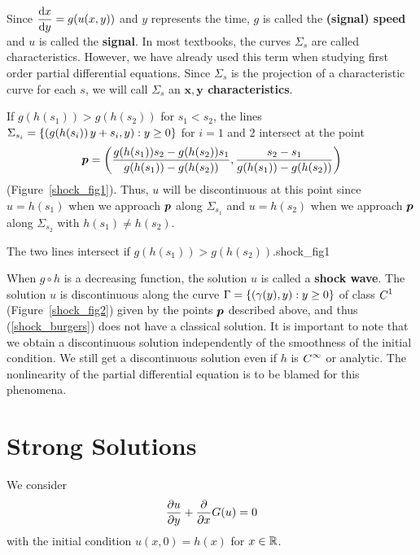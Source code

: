 Since $\DS \dydx{x}{y} = g(u(x,y))$ and $y$ represents the time,
$g$ is called the
{\bfseries (signal) speed} and
$u$ is called the {\bfseries signal}.
In most textbooks, the curves $\Sigma_s$ are called characteristics.  However,
we have already used this term when studying first order partial
differential equations.  Since $\Sigma_s$ is the projection of a
characteristic curve for each $s$, we will call $\Sigma_s$ an
{\bfseries $\mathbf{x,y}$ characteristics}.

If $g(h(s_1)) > g(h(s_2))$ for $s_1 < s_2$, the lines
$\DS \Sigma_{s_i} = \left\{ (g(h(s_i))\,y + s_i,y) : y \geq 0
\right\}$ for $i=1$ and $2$ intersect at the point
\[
\VEC{p} = \left( \frac{g(h(s_1)) s_2 - g(h(s_2))s_1}{g(h(s_1))-g(h(s_2))},
\frac{s_2-s_1}{g(h(s_1))-g(h(s_2))}\right)
\]
(Figure~\ref{shock_fig1}).
Thus, $u$ will be discontinuous at this point since
$u=h(s_1)$ when we approach $\VEC{p}$ along $\Sigma_{s_1}$ and
$u=h(s_2)$ when we approach $\VEC{p}$ along $\Sigma_{s_2}$ with 
$h(s_1) \neq h(s_2)$.

{The two lines intersect if $g(h(s_1))>g(h(s_2))$.}{shock_fig1}

When $g\circ h$ is a decreasing function, the solution $u$ is called a
{\bfseries shock wave}\label{Shock Wave}.  The solution $u$ is
discontinuous along the curve
$\DS \Gamma = \left\{ (\gamma(y),y) : y \geq 0 \right\}$ of
class $\DS C^1$
(Figure~\ref{shock_fig2}) given by the points $\VEC{p}$ described
above, and thus (\ref{shock_burgers}) does not
have a classical solution.  It is important to note that we obtain a
discontinuous solution independently of the smoothness of the initial
condition.  We still get a discontinuous solution even if $h$ is
$\DS C^\infty$ or analytic.  The nonlinearity of the partial
differential equation is to be blamed for this phenomena.


\section{Strong Solutions}

We consider
\begin{equation}\label{shock_burgers_g}
\pdydx{u}{y} + \pdfdx{G(u)}{x} = 0
\end{equation}
with the initial condition $u(x,0) = h(x)$ for $x \in \RR$.

